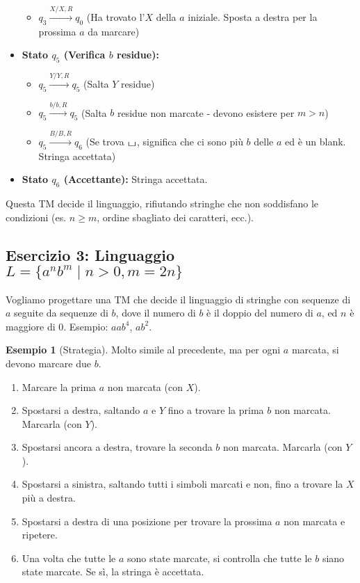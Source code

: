 \documentclass[a4paper]{article}
\theoremstyle{definition} %
\newtheorem{example}{Esempio}
\newcommand{\blankS}{\ensuremath{\raisebox{-0.15ex}{\scalebox{1.3}[0.7]{$\sqcup$}}}}
\begin{document}
\begin{itemize}
\begin{itemize}
            \item $q_3 \xrightarrow{X / X, R} q_0$ (Ha trovato l'$X$ della $a$ iniziale. Sposta a destra per la prossima $a$ da marcare)
        \end{itemize}
    \item \textbf{Stato $q_5$ (Verifica $b$ residue):}
        \begin{itemize}
            \item $q_5 \xrightarrow{Y / Y, R} q_5$ (Salta $Y$ residue)
            \item $q_5 \xrightarrow{b / b, R} q_5$ (Salta $b$ residue non marcate - devono esistere per $m>n$)
            \item $q_5 \xrightarrow{B / B, R} q_6$ (Se trova \blankS, significa che ci sono più $b$ delle $a$ ed è un blank. Stringa accettata)
        \end{itemize}
    \item \textbf{Stato $q_6$ (Accettante):} Stringa accettata.
\end{itemize}
Questa TM decide il linguaggio, rifiutando stringhe che non soddisfano le condizioni (es. $n \ge m$, ordine sbagliato dei caratteri, ecc.).

\subsection{Esercizio 3: Linguaggio $L = \{a^n b^m \mid n > 0, m = 2n\}$}

Vogliamo progettare una TM che decide il linguaggio di stringhe con sequenze di $a$ seguite da sequenze di $b$, dove il numero di $b$ è il doppio del numero di $a$, ed $n$ è maggiore di $0$. Esempio: $aab^{4}$, $ab^{2}$.

\begin{example}[Strategia]
Molto simile al precedente, ma per ogni $a$ marcata, si devono marcare due $b$.
\begin{enumerate}
    \item Marcare la prima $a$ non marcata (con $X$).
    \item Spostarsi a destra, saltando $a$ e $Y$ fino a trovare la prima $b$ non marcata. Marcarla (con $Y$).
    \item Spostarsi ancora a destra, trovare la seconda $b$ non marcata. Marcarla (con $Y$).
    \item Spostarsi a sinistra, saltando tutti i simboli marcati e non, fino a trovare la $X$ più a destra.
    \item Spostarsi a destra di una posizione per trovare la prossima $a$ non marcata e ripetere.
    \item Una volta che tutte le $a$ sono state marcate, si controlla che tutte le $b$ siano state marcate. Se sì, la stringa è accettata.
\end{enumerate}
\end{example}
\end{document}
